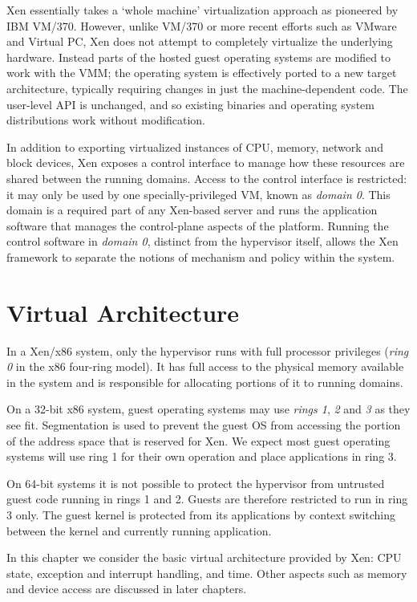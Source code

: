 \documentclass[11pt,twoside,final,openright,a4paper]{report}
\begin{document}
Xen essentially takes a `whole machine' virtualization approach as
pioneered by IBM VM/370.  However, unlike VM/370 or more recent
efforts such as VMware and Virtual PC, Xen does not attempt to
completely virtualize the underlying hardware.  Instead parts of the
hosted guest operating systems are modified to work with the VMM; the
operating system is effectively ported to a new target architecture,
typically requiring changes in just the machine-dependent code.  The
user-level API is unchanged, and so existing binaries and operating
system distributions work without modification.

In addition to exporting virtualized instances of CPU, memory, network
and block devices, Xen exposes a control interface to manage how these
resources are shared between the running domains. Access to the
control interface is restricted: it may only be used by one
specially-privileged VM, known as {\em domain 0}.  This domain is a
required part of any Xen-based server and runs the application software
that manages the control-plane aspects of the platform.  Running the
control software in {\it domain 0}, distinct from the hypervisor
itself, allows the Xen framework to separate the notions of 
mechanism and policy within the system.


\chapter{Virtual Architecture}

In a Xen/x86 system, only the hypervisor runs with full processor
privileges ({\it ring 0} in the x86 four-ring model). It has full
access to the physical memory available in the system and is
responsible for allocating portions of it to running domains.  

On a 32-bit x86 system, guest operating systems may use {\it rings 1},
{\it 2} and {\it 3} as they see fit.  Segmentation is used to prevent
the guest OS from accessing the portion of the address space that is
reserved for Xen.  We expect most guest operating systems will use
ring 1 for their own operation and place applications in ring 3.

On 64-bit systems it is not possible to protect the hypervisor from
untrusted guest code running in rings 1 and 2. Guests are therefore
restricted to run in ring 3 only. The guest kernel is protected from its
applications by context switching between the kernel and currently
running application.

In this chapter we consider the basic virtual architecture provided by
Xen: CPU state, exception and interrupt handling, and time.
Other aspects such as memory and device access are discussed in later
chapters.
\end{document}
